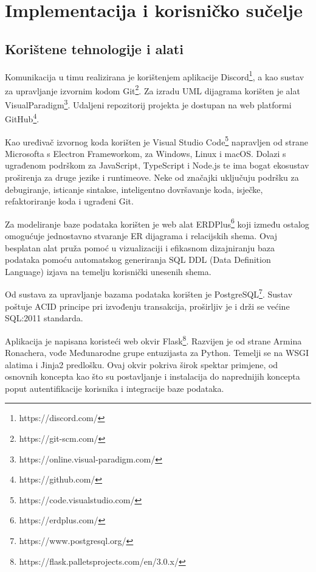 \chapter{Implementacija i korisničko sučelje}
		
		
		\section{Korištene tehnologije i alati}
		
			 Komunikacija u timu realizirana je korištenjem aplikacije Discord\footnote{https://discord.com/}, a kao sustav za upravljanje izvornim kodom Git\footnote{https://git-scm.com/}. Za izradu UML dijagrama korišten je alat VisualParadigm\footnote{https://online.visual-paradigm.com/}. Udaljeni repozitorij projekta je dostupan na web platformi GitHub\footnote{https://github.com/}.
			 
			 Kao uređivač izvornog koda korišten je Visual Studio Code\footnote{https://code.visualstudio.com/} napravljen od strane Microsofta s Electron Frameworkom, za Windows, Linux i macOS. Dolazi s ugrađenom podrškom za JavaScript, TypeScript i Node.js te ima bogat ekosustav proširenja za druge jezike i runtimeove. Neke od značajki uključuju podršku za debugiranje, isticanje sintakse, inteligentno dovršavanje koda, isječke, refaktoriranje koda i ugrađeni Git.
			 
			 Za modeliranje baze podataka korišten je web alat ERDPlus\footnote{https://erdplus.com/} koji između ostalog omogućuje jednostavno stvaranje ER dijagrama i relacijskih shema. Ovaj besplatan alat pruža pomoć u vizualizaciji i efikasnom dizajniranju baza podataka pomoću automatskog generiranja SQL DDL (Data Definition Language) izjava na temelju korisnički unesenih shema.
             
			 Od sustava za upravljanje bazama podataka korišten je PostgreSQL\footnote{ https://www.postgresql.org/}. Sustav poštuje ACID principe pri izvođenju transakcija, proširljiv je i drži se većine SQL:2011 standarda.
			 
			 Aplikacija je napisana koristeći web okvir Flask\footnote{https://flask.palletsprojects.com/en/3.0.x/}. Razvijen je od strane Armina Ronachera, vođe Međunarodne grupe entuzijasta za Python. Temelji se na WSGI alatima i Jinja2 predlošku. Ovaj okvir pokriva širok spektar primjene, od osnovnih koncepta kao što su postavljanje i instalacija do naprednijih koncepta poput autentifikacije korisnika i integracije baze podataka.
			 
